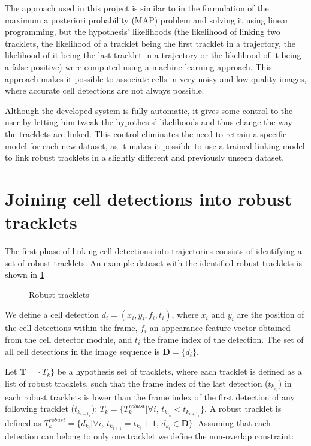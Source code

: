 		The approach used in this project is similar to \cite{bise11} in the formulation of the maximum a posteriori probability (MAP) problem and solving it using linear programming, but the hypothesis' likelihoods (the likelihood of linking two tracklets, the likelihood of a tracklet being the first tracklet in a trajectory, the likelihood of it being the last tracklet in a trajectory or the likelihood of it being a false positive) were computed using a machine learning approach. This approach makes it possible to associate cells in very noisy and low quality images, where accurate cell detections are not always possible.
		
		Although the developed system is fully automatic, it gives some control to the user by letting him tweak the hypothesis' likelihoods and thus change the way the tracklets are linked. This control eliminates the need to retrain a specific model for each new dataset, as it makes it possible to use a trained linking model to link robust tracklets in a slightly different and previously unseen dataset.
	
	\section{Joining cell detections into robust tracklets \statusfirstdraft}
	
		The first phase of linking cell detections into trajectories consists of identifying a set of robust tracklets. An example dataset with the identified robust tracklets is shown in \cref{fig:robusttracklets}
		
		\begin{figure}[h]
			\centering
			\caption{Robust tracklets}
			\label{fig:robusttracklets}
		\end{figure}
		
		We define a cell detection $ d_i = (x_i, y_i, f_i, t_i) $, where $x_i$ and $y_i$ are the position of the cell detections within the frame, $ f_i $ an appearance feature vector obtained from the cell detector module, and $t_i$ the frame index of the detection. The set of all cell detections in the image sequence is $\textbf{D} = \{d_i\}$. 
		
		Let $ \textbf{T} = \{ T_k \} $ be a hypothesis set of tracklets, where each tracklet is defined as a list of robust tracklets, such that the frame index of the last detection ($ t_{k_{i_n}} $) in each robust tracklets is lower than the frame index of the first detection of any following tracklet ($  t_{k_{{i+1}_1}} $):	$T_k = \{T_k^{robust} | \forall i\text{, }  t_{k_{i_n}} < t_{k_{{i+1}_1}} \}$. A robust tracklet is defined as $ T_k^{robust} = \{ d_{k_i} | \forall i\text{, } t_{k_{i+1}} = t_{k_i}+1\text{, } d_{k_i} \in \textbf{D} \} $. Assuming that each detection can belong to only one tracklet we define the non-overlap constraint:
		

